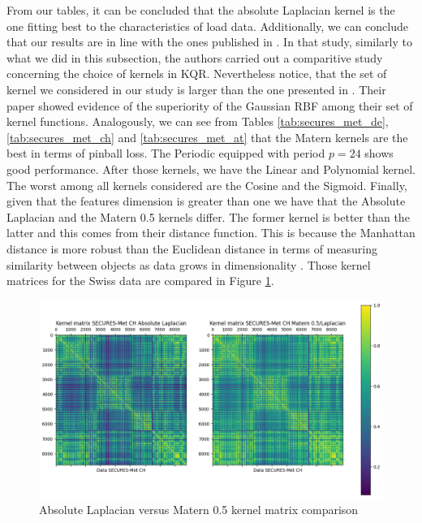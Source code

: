 From our tables, it can be concluded that the absolute Laplacian kernel is the one fitting best to the characteristics of load data.
Additionally, we can conclude that our results are in line with the ones published in \cite{he2017short}. In that study, similarly to what we did in this subsection, the authors carried out a comparitive study concerning the choice of kernels in KQR. Nevertheless notice, that the set of kernel we considered in our study is larger than the one presented in \cite{he2017short}.
Their paper showed evidence of the superiority of the Gaussian RBF among their set of kernel functions. Analogously, we can see from Tables \ref{tab:secures_met_de}, \ref{tab:secures_met_ch} and \ref{tab:secures_met_at} that the Matern kernels are the best in terms of pinball loss.
The Periodic equipped with period $p=24$ shows good performance. 
After those kernels, we have the Linear and Polynomial kernel.
The worst among all kernels considered are the Cosine and the Sigmoid.
Finally, given that the features dimension is greater than one we have that the Absolute Laplacian and the Matern 0.5 kernels differ. The former kernel is better than the latter and this comes from their distance function. This is because the Manhattan distance is more robust than the Euclidean distance in terms of measuring similarity between objects as data grows in dimensionality \cite{Aggarwal2001}. %
Those kernel matrices for the Swiss data are compared in Figure \ref{fig:k_matrix_laplacian_comp}.

\begin{figure}[!ht]
    \includegraphics[width=\textwidth]{images/k_matrix_laplacian_comp.png}
    \caption{Absolute Laplacian versus Matern 0.5 kernel matrix comparison}
    \label{fig:k_matrix_laplacian_comp}
\end{figure}

